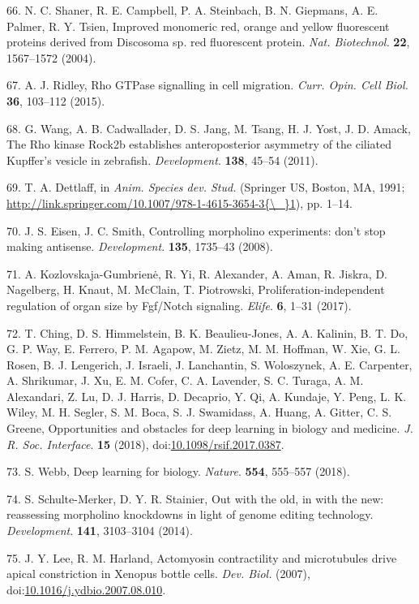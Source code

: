 \documentclass[11pt,singlespacinge,twoside]{reedthesis} %
\begin{document}
\leavevmode\hypertarget{ref-Shaner2004}{}%
66. N. C. Shaner, R. E. Campbell, P. A. Steinbach, B. N. Giepmans, A. E. Palmer, R. Y. Tsien, Improved monomeric red, orange and yellow fluorescent proteins derived from Discosoma sp. red fluorescent protein. \emph{Nat. Biotechnol.} \textbf{22}, 1567--1572 (2004).

\leavevmode\hypertarget{ref-Ridley2015}{}%
67. A. J. Ridley, Rho GTPase signalling in cell migration. \emph{Curr. Opin. Cell Biol.} \textbf{36}, 103--112 (2015).

\leavevmode\hypertarget{ref-Wang2011}{}%
68. G. Wang, A. B. Cadwallader, D. S. Jang, M. Tsang, H. J. Yost, J. D. Amack, The Rho kinase Rock2b establishes anteroposterior asymmetry of the ciliated Kupffer's vesicle in zebrafish. \emph{Development}. \textbf{138}, 45--54 (2011).

\leavevmode\hypertarget{ref-Dettlaff1991}{}%
69. T. A. Dettlaff, in \emph{Anim. Species dev. Stud.} (Springer US, Boston, MA, 1991; \href{http://link.springer.com/10.1007/978-1-4615-3654-3\%7B/_\%7D1}{http://link.springer.com/10.1007/978-1-4615-3654-3\{\textbackslash{}\_\}1}), pp. 1--14.

\leavevmode\hypertarget{ref-Eisen2008b}{}%
70. J. S. Eisen, J. C. Smith, Controlling morpholino experiments: don't stop making antisense. \emph{Development}. \textbf{135}, 1735--43 (2008).

\leavevmode\hypertarget{ref-Kozlovskaja-Gumbriene2017}{}%
71. A. Kozlovskaja-Gumbrienė, R. Yi, R. Alexander, A. Aman, R. Jiskra, D. Nagelberg, H. Knaut, M. McClain, T. Piotrowski, Proliferation-independent regulation of organ size by Fgf/Notch signaling. \emph{Elife}. \textbf{6}, 1--31 (2017).

\leavevmode\hypertarget{ref-Ching2018}{}%
72. T. Ching, D. S. Himmelstein, B. K. Beaulieu-Jones, A. A. Kalinin, B. T. Do, G. P. Way, E. Ferrero, P. M. Agapow, M. Zietz, M. M. Hoffman, W. Xie, G. L. Rosen, B. J. Lengerich, J. Israeli, J. Lanchantin, S. Woloszynek, A. E. Carpenter, A. Shrikumar, J. Xu, E. M. Cofer, C. A. Lavender, S. C. Turaga, A. M. Alexandari, Z. Lu, D. J. Harris, D. Decaprio, Y. Qi, A. Kundaje, Y. Peng, L. K. Wiley, M. H. Segler, S. M. Boca, S. J. Swamidass, A. Huang, A. Gitter, C. S. Greene, Opportunities and obstacles for deep learning in biology and medicine. \emph{J. R. Soc. Interface}. \textbf{15} (2018), doi:\href{https://doi.org/10.1098/rsif.2017.0387}{10.1098/rsif.2017.0387}.

\leavevmode\hypertarget{ref-Webb2018}{}%
73. S. Webb, Deep learning for biology. \emph{Nature}. \textbf{554}, 555--557 (2018).

\leavevmode\hypertarget{ref-Schulte-Merker2014c}{}%
74. S. Schulte-Merker, D. Y. R. Stainier, Out with the old, in with the new: reassessing morpholino knockdowns in light of genome editing technology. \emph{Development}. \textbf{141}, 3103--3104 (2014).

\leavevmode\hypertarget{ref-Lee2007a}{}%
75. J. Y. Lee, R. M. Harland, Actomyosin contractility and microtubules drive apical constriction in Xenopus bottle cells. \emph{Dev. Biol.} (2007), doi:\href{https://doi.org/10.1016/j.ydbio.2007.08.010}{10.1016/j.ydbio.2007.08.010}.


\end{document}
